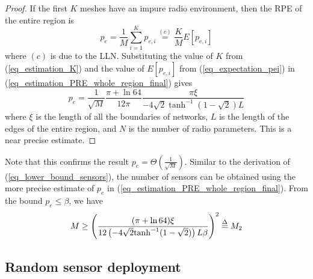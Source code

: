 \documentclass[conference]{IEEEtran}
\begin{document}
\begin{proof}
If the first $K$ meshes have an impure radio environment, then the RPE of the entire region is
\begin{equation}\label{eq_estimation_PRE_whole_region}
{p_e} = \frac{1}{M}\sum\limits_{i = 1}^K {{p_{e,i}}} \mathop  = \limits^{(c)} \frac{K}{M}E[{p_{e,i}}]
\end{equation}
where $(c)$ is due to the LLN.
Substituting the value of $K$ from (\ref{eq_estimation_K}) and the value of $E[{p_{e,i}}]$ from (\ref{eq_expectation_pei})
in (\ref{eq_estimation_PRE_whole_region_final}) gives
\begin{equation}\label{eq_estimation_PRE_whole_region_final}
{p_e} = \frac{1}{{\sqrt M }}\frac{{\pi  + \ln 64}}{{12\pi }}\frac{{\pi \xi }}{{ - 4\sqrt 2 {{\tanh }^{ - 1}}(1 - \sqrt 2 )L}}
\end{equation}
where $\xi$ is the length of all the boundaries of networks, $L$ is the length of the edges of the entire region, and $N$ is the number of radio parameters.
This is a near precise estimate.
\end{proof}

Note that this confirms the result ${p_e} = \Theta \left( {\frac{1}{{\sqrt M }}} \right)$.
Similar to the derivation of (\ref{eq_lower_bound_sensors}), the number of sensors
can be obtained using the more precise estimate of $p_e$ in (\ref{eq_estimation_PRE_whole_region_final}).
From the bound ${p_e} \le \beta$, we have
\begin{equation}\label{eq_M2}
M \ge {\left( {\frac{{(\pi  + \ln 64)\xi }}{{12\left( { - 4\sqrt 2 {{\tanh }^{ - 1}}(1 - \sqrt 2 )} \right)L\beta }}} \right)^2} \buildrel \Delta \over = {M_2}
\end{equation}

\subsection{Random sensor deployment}
\end{document}
